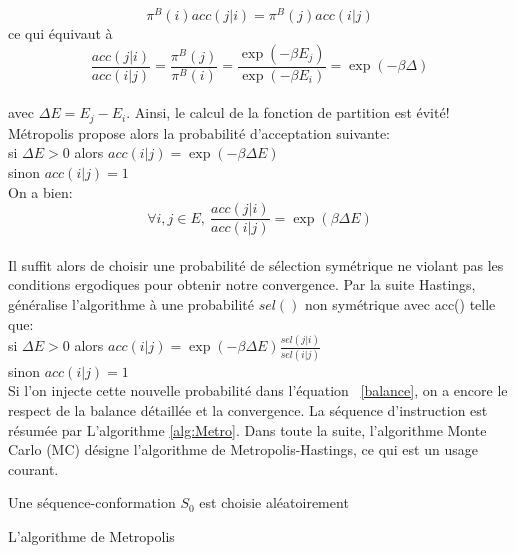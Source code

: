 \begin{equation}
    \label{bd_Metropolis}
\pi^B(i)acc(j|i) = \pi^B(j)acc(i|j) 
\end{equation}
ce qui équivaut à
\begin{equation}
\frac{acc(j|i)}{acc(i|j)} =\frac{\pi^B(j)}{\pi^B(i)} = \frac{\exp(-\beta E_j)}{\exp(-\beta E_i)} = \exp(-\beta \Delta) 
\end{equation}\\
avec $\Delta E =  E_j - E_i$. Ainsi, le calcul de la fonction de partition est évité! Métropolis propose alors la probabilité d'acceptation suivante:\\
si $\Delta E >0$ alors $acc(i|j) = \exp(- \beta \Delta E)$ \\
sinon
$acc(i|j)=1$\\
On a bien: 
\begin{equation}
\forall i,j \in E,\ \frac{acc(j|i)}{acc(i|j)} = \exp(\beta \Delta E)
\end{equation}\\
Il suffit alors de choisir une probabilité de sélection symétrique ne violant pas les conditions ergodiques pour obtenir notre convergence. Par la suite Hastings, généralise l'algorithme à une probabilité $sel()$ non symétrique avec acc() telle que:\\
si $\Delta E >0$ alors $acc(i|j) = \exp(- \beta \Delta E) \frac{sel(j|i)}{sel(i|j)}$ \\
sinon $acc(i|j)=1$\\
Si l'on injecte cette nouvelle probabilité dans l'équation ~\ref{balance}, on a encore le respect de la balance détaillée et la convergence. La séquence d'instruction est résumée par L'algorithme \ref{alg:Metro}. Dans toute la suite, l'algorithme Monte Carlo (MC) désigne l'algorithme de Metropolis-Hastings, ce qui est un usage courant.


\begin{algorithm}
  Une séquence-conformation $S_0$ est choisie aléatoirement\;
\caption{L'algorithme de Metropolis} \label{alg:Metro}
\end{algorithm}


